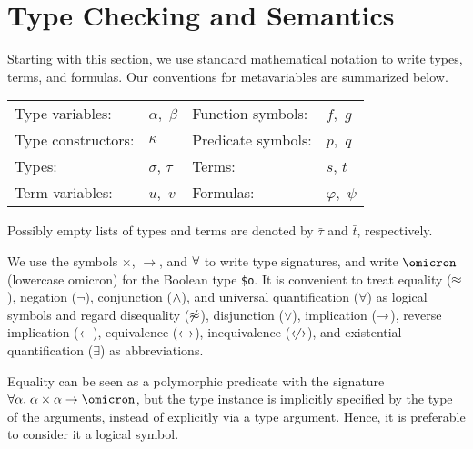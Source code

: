 \section{Type Checking and Semantics} \label{sec_semantics}

 Starting with this section, we use standard
mathematical notation to write types, terms, and formulas. Our conventions
for metavariables are summarized below.
%
\begin{center}
\begin{tabular}{l@{\enskip}l@{\qquad}l@{\enskip}l}
Type variables: & $\alpha,$ $\beta$ &
  Function symbols: & $f,$ $g$ \\
Type constructors: & $\kappa$ &
  Predicate symbols: & $p,$ $q$ \\
Types: & $\sigma$, $\tau$ &
  Terms: & $s$, $t$ \\
Term variables: & $u,$ $v$ &
  Formulas: & $\varphi,$ $\psi$
\end{tabular}
\end{center}
%
Possibly empty lists of types and terms are denoted by $\bar{\tau}$ and
$\bar{t}$, respectively.

We use the symbols ${\times}$, ${\to}$, and ${\forall}$
to write type signatures, and write $\omicron$ (lowercase omicron) for the
Boolean type {\tt \$o}. It is convenient to treat
equality ($\approx$), negation ($\lnot$), conjunction ($\mathrel{\land}$), and universal
quantification ($\forall$) as logical symbols and regard disequality
($\not\approx$), disjunction ($\lor$), implication ($\rightarrow$), reverse implication
($\leftarrow$), equivalence ($\leftarrow\kern-1.75ex\rightarrow$), inequivalence ($\kern.4875ex\not\kern-.4875ex\leftarrow\kern-1.75ex\rightarrow$), and existential
quantification ($\exists$) as abbreviations.

Equality can be seen as a polymorphic predicate with the signature
$\forall\alpha.\; \alpha\times\alpha\to\omicron$, but the type instance is
implicitly specified by the type of the arguments, instead of explicitly via a
type argument. Hence, it is preferable to consider it a logical
symbol.

